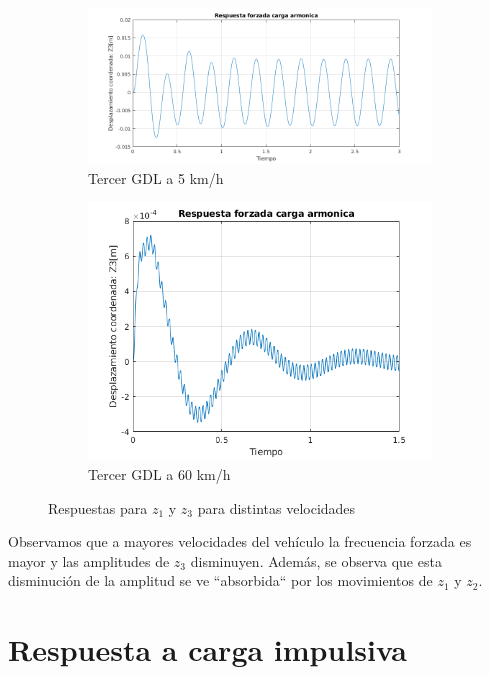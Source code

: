 \documentclass[oneside, a4paper, spanish, links]{amca}
\begin{document}
\begin{figure}[h]
\begin{subfigure}[b]{0.475\textwidth}
        \centering 
        \includegraphics[width=\textwidth]{respforcompletaZ35kmh.png}
        \caption[]
        {{\small Tercer GDL a 5 km/h}}    
    \end{subfigure}
    \quad
    \begin{subfigure}[b]{0.475\textwidth}   
        \centering 
        \includegraphics[width=\textwidth]{respforcompletaZ360kmh.png}
        \caption[]
        {{\small Tercer GDL a 60 km/h}}    

    \end{subfigure}
    \caption[  ]
    {\small Respuestas para $z_1$ y $z_3$ para distintas velocidades} 
    \label{fig:z1 vib forz}
\end{figure}

Observamos que a mayores velocidades del vehículo la frecuencia forzada es mayor y las amplitudes de $z_3$ disminuyen. Además, se observa que esta disminución de la amplitud se ve ``absorbida`` por los movimientos de $z_1$ y $z_2$. 

\newpage
\section{Respuesta a carga impulsiva}
\end{document}
